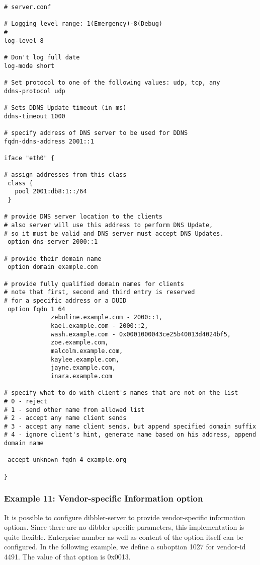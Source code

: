 \begin{lstlisting}
# server.conf

# Logging level range: 1(Emergency)-8(Debug)
#
log-level 8

# Don't log full date
log-mode short

# Set protocol to one of the following values: udp, tcp, any
ddns-protocol udp

# Sets DDNS Update timeout (in ms)
ddns-timeout 1000

# specify address of DNS server to be used for DDNS
fqdn-ddns-address 2001::1

iface "eth0" {

# assign addresses from this class
 class {
   pool 2001:db8:1::/64
 }

# provide DNS server location to the clients
# also server will use this address to perform DNS Update,
# so it must be valid and DNS server must accept DNS Updates.
 option dns-server 2000::1

# provide their domain name
 option domain example.com

# provide fully qualified domain names for clients
# note that first, second and third entry is reserved
# for a specific address or a DUID
 option fqdn 1 64
             zebuline.example.com - 2000::1,
             kael.example.com - 2000::2,
             wash.example.com - 0x0001000043ce25b40013d4024bf5,
             zoe.example.com,
             malcolm.example.com,
             kaylee.example.com,
             jayne.example.com,
             inara.example.com

# specify what to do with client's names that are not on the list
# 0 - reject
# 1 - send other name from allowed list
# 2 - accept any name client sends
# 3 - accept any name client sends, but append specified domain suffix
# 4 - ignore client's hint, generate name based on his address, append domain name

 accept-unknown-fqdn 4 example.org

}
\end{lstlisting}

\subsubsection{Example 11: Vendor-specific Information option}
\label{example-server-vendor-spec}
It is possible to configure dibbler-server to provide vendor-specific
information options. Since there are no dibbler-specific parameters,
this implementation is quite flexible. Enterprise number as well as
content of the option itself can be configured. In the following
example, we define a suboption 1027 for vendor-id 4491. The value
of that option is 0x0013.

